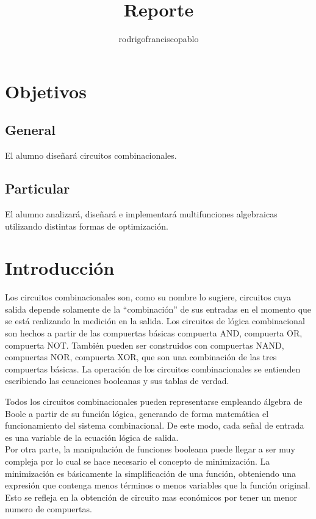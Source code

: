 \documentclass{mylib/reporteConCalif}
\title{Reporte}
\author{rodrigofranciscopablo }
\begin{document}
\coverPage

\tableofcontents
\newpage

\section{Objetivos}

\subsection{General}

El alumno diseñará circuitos combinacionales.

\subsection{Particular}

El alumno analizará, diseñará e implementará multifunciones algebraicas utilizando distintas formas
de optimización.

\section{Introducción}

Los circuitos combinacionales son, como su nombre lo sugiere, circuitos cuya salida depende solamente de la “combinación” de sus entradas en el momento que se está realizando la medición en la salida.
Los circuitos de lógica combinacional son hechos a partir de las compuertas básicas compuerta AND, compuerta OR, compuerta NOT. También pueden ser construidos con compuertas NAND, compuertas NOR, compuerta XOR, que son una combinación de las tres compuertas básicas.
La operación de los circuitos combinacionales se entienden escribiendo las ecuaciones booleanas y sus tablas de verdad.

Todos los circuitos combinacionales pueden representarse empleando álgebra de Boole a partir de su función lógica, generando de forma matemática el funcionamiento del sistema combinacional. De este modo, cada señal de entrada es una variable de la ecuación lógica de salida. \\

Por otra parte, la manipulación de funciones booleana puede llegar a ser muy compleja por lo cual se hace necesario el concepto de minimización. La minimización es básicamente la simplificación de una función, obteniendo una expresión que contenga menos términos o menos variables que la función original.  Esto se refleja en la obtención de circuito mas económicos por tener un menor numero de compuertas.
\end{document}
